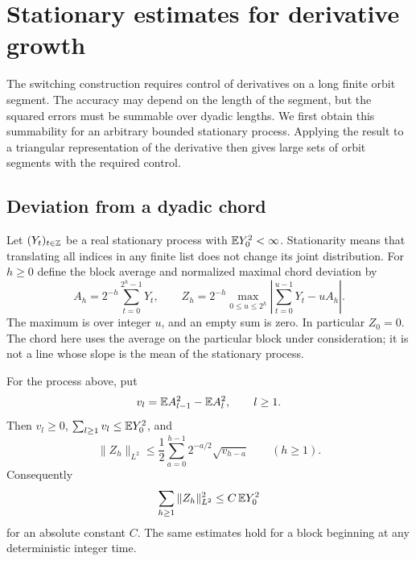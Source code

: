 \section{Stationary estimates for derivative growth}\label{sec:stationary}

The switching construction requires control of derivatives on a long finite
orbit segment.  The accuracy may depend on the length of the segment, but
the squared errors must be summable over dyadic lengths.  We first obtain
this summability for an arbitrary bounded stationary process.  Applying
the result to a triangular representation of the derivative then gives
large sets of orbit segments with the required control.

\subsection{Deviation from a dyadic chord}

Let $(Y_t)_{t\in\mathbb Z}$ be a real stationary process with
$\mathbb E Y_0^2<\infty$.  Stationarity means that translating all indices in
any finite list does not change its joint distribution.  For $h\geq 0$
define the block average and normalized maximal chord deviation by
\[
 A_h=2^{-h}\sum_{t=0}^{2^h-1}Y_t,
 \qquad
 Z_h=2^{-h}\max_{0\leq u\leq 2^h}
 \left|\sum_{t=0}^{u-1}Y_t-uA_h\right|.
\]
The maximum is over integer $u$, and an empty sum is zero.
In particular $Z_0=0$.  The chord here uses the average on the
particular block under consideration; it is not a line whose slope is
the mean of the stationary process.

\begin{lemma}\label{lem:dyadic}
For the process above, put
\[
 v_l=\mathbb E A_{l-1}^2-\mathbb E A_l^2,\qquad l\geq 1.
\]
Then $v_l\geq 0$, $\sum_{l\geq 1}v_l\leq\mathbb E Y_0^2$, and
\begin{equation}\label{eq:dyadic-convolution}
 \|Z_h\|_{L^2}
 \leq \frac12\sum_{a=0}^{h-1}2^{-a/2}\sqrt{v_{h-a}}
 \qquad(h\geq 1).
\end{equation}
Consequently
\begin{equation}\label{eq:dyadic-square-sum}
 \sum_{h\geq 1}\|Z_h\|_{L^2}^2
 \leq C\,\mathbb E Y_0^2
\end{equation}
for an absolute constant $C$.  The same estimates hold for a block
beginning at any deterministic integer time.
\end{lemma}


